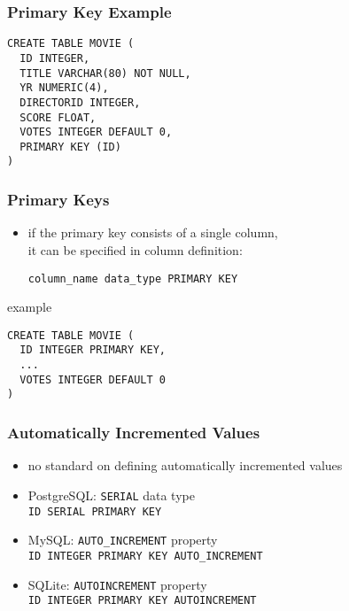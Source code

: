 \documentclass[dvipsnames]{beamer}
\theoremstyle{plain}
\begin{document}
\begin{frame}[fragile]
  \frametitle{Primary Key Example}

  \begin{lstlisting}
CREATE TABLE MOVIE (
  ID INTEGER,
  TITLE VARCHAR(80) NOT NULL,
  YR NUMERIC(4),
  DIRECTORID INTEGER,
  SCORE FLOAT,
  VOTES INTEGER DEFAULT 0,
  PRIMARY KEY (ID)
)
  \end{lstlisting}
\end{frame}

\begin{frame}[fragile]
  \frametitle{Primary Keys}

  \begin{itemize}
    \item if the primary key consists of a single column,\\
      it can be specified in column definition:
    \begin{lstlisting}
column_name data_type PRIMARY KEY
    \end{lstlisting}
  \end{itemize}

  \begin{exampleblock}{example}
    \begin{lstlisting}
CREATE TABLE MOVIE (
  ID INTEGER PRIMARY KEY,
  ...
  VOTES INTEGER DEFAULT 0
)
    \end{lstlisting}
  \end{exampleblock}
\end{frame}

\begin{frame}[fragile]
  \frametitle{Automatically Incremented Values}

  \begin{itemize}
    \item no standard on defining automatically incremented values

    \bigskip
    \item PostgreSQL: \texttt{SERIAL} data type\\
      \lstinline!ID SERIAL PRIMARY KEY!

    \smallskip
    \item MySQL: \texttt{AUTO\_INCREMENT} property\\
      \lstinline!ID INTEGER PRIMARY KEY AUTO_INCREMENT!

    \smallskip
    \item SQLite: \texttt{AUTOINCREMENT} property\\
      \lstinline!ID INTEGER PRIMARY KEY AUTOINCREMENT!
  \end{itemize}
\end{frame}
\end{document}
